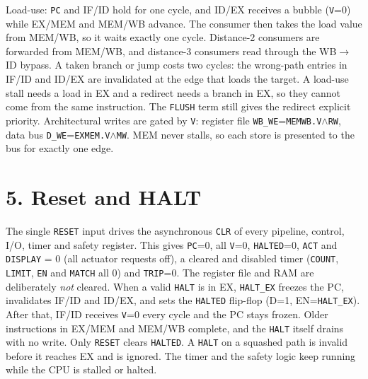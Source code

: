 \documentclass[10pt,a4paper]{article}
\begin{document}
Load-use: \texttt{PC} and IF/ID hold for one cycle, and ID/EX receives a bubble (\texttt{V}=0) while EX/MEM and MEM/WB advance. The
consumer then takes the load value from MEM/WB, so it waits exactly one cycle. Distance-2 consumers are forwarded
from MEM/WB, and distance-3 consumers read through the WB$\rightarrow$ID bypass. A taken branch or jump costs two cycles: the
wrong-path entries in IF/ID and ID/EX are invalidated at the edge that loads the target. A load-use stall needs a load in
EX and a redirect needs a branch in EX, so they cannot come from the same instruction. The \texttt{FLUSH} term still
gives the redirect explicit priority. Architectural writes are gated by \texttt{V}: register file
\texttt{WB\_WE}=\texttt{MEMWB.V}$\wedge$\texttt{RW}, data bus \texttt{D\_WE}=\texttt{EXMEM.V}$\wedge$\texttt{MW}. MEM never
stalls, so each store is presented to the bus for exactly one edge.

\section*{5. Reset and HALT}
The single \texttt{RESET} input drives the asynchronous \texttt{CLR} of every pipeline, control, I/O, timer and safety register.
This gives \texttt{PC}=0, all \texttt{V}=0, \texttt{HALTED}=0, \texttt{ACT} and \texttt{DISPLAY} = 0 (all actuator requests off), a cleared
and disabled timer (\texttt{COUNT}, \texttt{LIMIT}, \texttt{EN} and \texttt{MATCH} all 0) and \texttt{TRIP}=0. The register file and RAM are
deliberately \emph{not} cleared. When a valid \texttt{HALT} is in EX, \texttt{HALT\_EX} freezes the PC, invalidates IF/ID and
ID/EX, and sets the \texttt{HALTED} flip-flop (D=1, EN=\texttt{HALT\_EX}). After that, IF/ID receives \texttt{V}=0 every cycle and
the PC stays frozen. Older instructions in EX/MEM and MEM/WB complete, and the \texttt{HALT} itself drains with no write.
Only \texttt{RESET} clears \texttt{HALTED}. A \texttt{HALT} on a squashed path is invalid before it reaches EX and is ignored.
The timer and the safety logic keep running while the CPU is stalled or halted.
\end{document}
